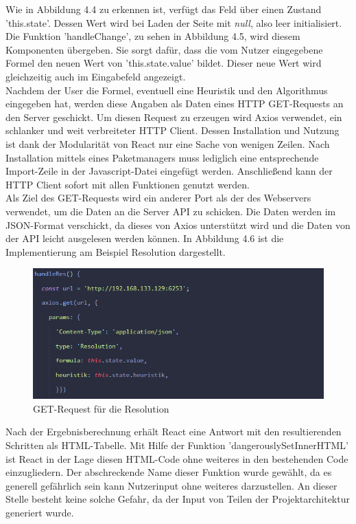 \noindent Wie in Abbildung 4.4 zu erkennen ist, verfügt das Feld über einen Zustand 'this.state'. Dessen Wert wird bei Laden der Seite mit \textit{null}, also leer initialisiert. Die Funktion 'handleChange', zu sehen in Abbildung 4.5, wird diesem Komponenten übergeben. Sie sorgt dafür, dass die vom Nutzer eingegebene Formel den neuen Wert von 'this.state.value' bildet. Dieser neue Wert wird gleichzeitig auch im Eingabefeld angezeigt.\\
Nachdem der User die Formel, eventuell eine Heuristik und den Algorithmus eingegeben hat, werden diese Angaben als Daten eines HTTP GET-Requests an den Server geschickt. Um diesen Request zu erzeugen wird Axios verwendet, ein schlanker und weit verbreiteter HTTP Client.
Dessen Installation und Nutzung ist dank der Modularität von React nur eine Sache von wenigen Zeilen. Nach Installation mittels eines Paketmanagers muss lediglich eine entsprechende Import-Zeile in der Javascript-Datei eingefügt werden. Anschließend kann der HTTP Client sofort mit allen Funktionen genutzt werden. \\
Als Ziel des GET-Requests wird ein anderer Port als der des Webservers verwendet, um die Daten an die Server API zu schicken. Die Daten werden im JSON-Format verschickt, da dieses von Axios unterstützt wird und die Daten von der API leicht ausgelesen werden können. In Abbildung 4.6 ist die Implementierung am Beispiel Resolution dargestellt.
\begin{figure}[H]
     \centerline{\includegraphics[width=14cm]{../Abbildungen/axiosResolution.png}}
  \caption{GET-Request für die Resolution \cite{eig}}
  \label{fig1_1}
\end{figure}
\noindent Nach der Ergebnisberechnung erhält React eine Antwort mit den resultierenden Schritten als HTML-Tabelle. Mit Hilfe der Funktion 'dangerouslySetInnerHTML' ist React in der Lage diesen HTML-Code ohne weiteres in den bestehenden Code einzugliedern. Der abschreckende Name dieser Funktion wurde gewählt, da es generell gefährlich sein kann Nutzerinput ohne weiteres darzustellen. An dieser Stelle besteht keine solche Gefahr, da der Input von Teilen der Projektarchitektur generiert wurde.
